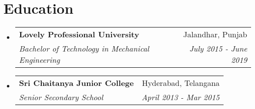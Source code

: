 \documentclass[letterpaper,11pt]{article}
\makeatletter
\newcommand{\resumeSubheading}[4]{
  \vspace{-2pt}\item
    \begin{tabular*}{0.97\textwidth}[t]{l@{\extracolsep{\fill}}r}
      \textbf{#1} & #2 \\
      \textit{\small#3} & \textit{\small #4} \\
    \end{tabular*}\vspace{-7pt}
}
\newcommand{\resumeSubHeadingListStart}{\begin{itemize}[leftmargin=0.15in, label={}]}
\newcommand{\resumeSubHeadingListEnd}{\end{itemize}}
\makeatother
\begin{document}
\section{Education}
  \resumeSubHeadingListStart
    \resumeSubheading
      {Lovely Professional University}{Jalandhar, Punjab}
      {Bachelor of Technology in Mechanical Engineering}{July 2015 - June 2019}
      \resumeSubheading
      {Sri Chaitanya Junior College}{Hyderabad, Telangana}
      {Senior Secondary School}{April 2013 - Mar 2015}
    
  \resumeSubHeadingListEnd

%
\end{document}
